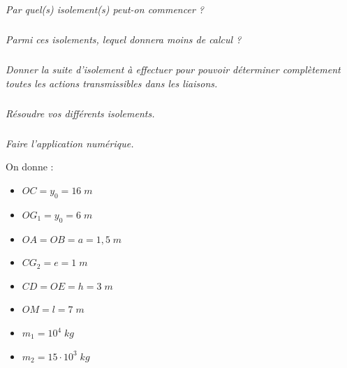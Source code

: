 \documentclass[10pt]{article}
\begin{document}
\subparagraph{}
\textit{Par quel(s) isolement(s) peut-on commencer ?}

\subparagraph{}
\textit{Parmi ces isolements, lequel donnera moins de calcul ?}

\subparagraph{}
\textit{Donner la suite d’isolement à effectuer pour pouvoir déterminer complètement toutes
les actions transmissibles dans les liaisons.}

\subparagraph{}
\textit{Résoudre vos différents isolements.}

\subparagraph{}
\textit{Faire l’application numérique.}


On donne :
\begin{itemize}
\item $OC = y_0 = 16\; m$
\item $OG_1 = y_0 = 6\; m$
\item $OA=OB=a = 1,5\; m$
\item $CG_2 = e = 1\; m$
\item $CD=OE = h = 3\; m$
\item $OM = l = 7\; m$
\item $m_1=10^4 \; kg$
\item $m_2=15 \cdot 10^3 \; kg$
\end{itemize}

\newpage

\begin{thebibliography}{2}
\end{thebibliography}
\end{document}

